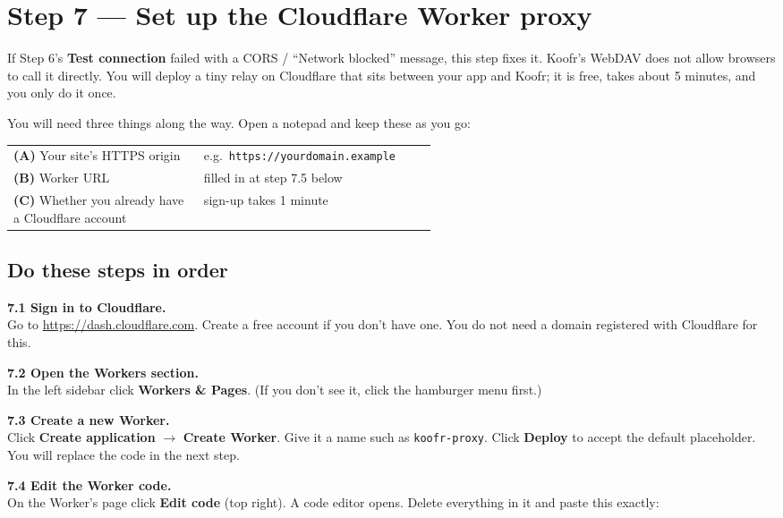 \documentclass[11pt,a4paper]{article}
\begin{document}
\section{Step 7 --- Set up the Cloudflare Worker proxy}

If Step 6's \textbf{Test connection} failed with a CORS / ``Network blocked'' message, this step fixes it. Koofr's WebDAV does not allow browsers to call it directly. You will deploy a tiny relay on Cloudflare that sits between your app and Koofr; it is free, takes about 5 minutes, and you only do it once.

You will need three things along the way. Open a notepad and keep these as you go:

\begin{center}
\small
\begin{tabular}{lp{0.55\linewidth}}
\textbf{(A)} Your site's HTTPS origin & e.g.\ \texttt{https://yourdomain.example} \\
\textbf{(B)} Worker URL & filled in at step 7.5 below \\
\textbf{(C)} Whether you already have a Cloudflare account & sign-up takes 1 minute \\
\end{tabular}
\end{center}

\subsection*{Do these steps in order}

\textbf{7.1 Sign in to Cloudflare.}\\
Go to \url{https://dash.cloudflare.com}. Create a free account if you don't have one. You do not need a domain registered with Cloudflare for this.

\textbf{7.2 Open the Workers section.}\\
In the left sidebar click \textbf{Workers \& Pages}. (If you don't see it, click the hamburger menu first.)

\textbf{7.3 Create a new Worker.}\\
Click \textbf{Create application} $\rightarrow$ \textbf{Create Worker}. Give it a name such as \texttt{koofr-proxy}. Click \textbf{Deploy} to accept the default placeholder. You will replace the code in the next step.

\textbf{7.4 Edit the Worker code.}\\
On the Worker's page click \textbf{Edit code} (top right). A code editor opens. Delete everything in it and paste this exactly:
\end{document}
